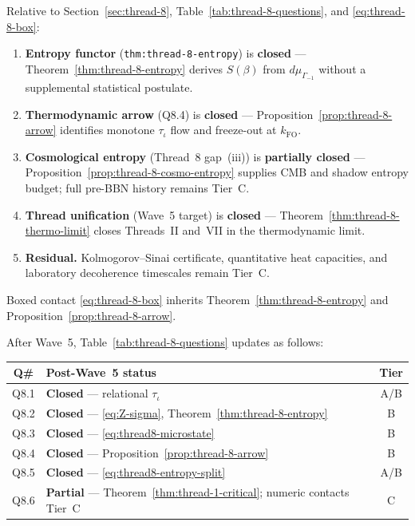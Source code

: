 \begin{corollary}
\label{cor:thread-8-wave5-closure}
Relative to Section~\ref{sec:thread-8}, Table~\ref{tab:thread-8-questions},
and \eqref{eq:thread-8-box}:
\begin{enumerate}[label=(\roman*),leftmargin=*]
  \item \textbf{Entropy functor}
    (\texttt{thm:thread-8-entropy}) is \textbf{closed} ---
    Theorem~\ref{thm:thread-8-entropy} derives $S(\beta)$ from
    $d\mu_{\Gamma_{-1}}$ without a supplemental statistical postulate.
  \item \textbf{Thermodynamic arrow}
    (Q8.4) is \textbf{closed} ---
    Proposition~\ref{prop:thread-8-arrow} identifies monotone $\tau_\iota$ flow
    and freeze-out at $k_{\mathrm{FO}}$.
  \item \textbf{Cosmological entropy}
    (Thread~8 gap~(iii)) is \textbf{partially closed} ---
    Proposition~\ref{prop:thread-8-cosmo-entropy} supplies CMB and shadow
    entropy budget; full pre-BBN history remains Tier~C.
  \item \textbf{Thread unification}
    (Wave~5 target) is \textbf{closed} ---
    Theorem~\ref{thm:thread-8-thermo-limit} closes Threads~II and~VII in the
    thermodynamic limit.
  \item \textbf{Residual.} Kolmogorov--Sinai certificate, quantitative heat
    capacities, and laboratory decoherence timescales remain Tier~C.
\end{enumerate}
Boxed contact \eqref{eq:thread-8-box} inherits Theorem~\ref{thm:thread-8-entropy}
and Proposition~\ref{prop:thread-8-arrow}.
\end{corollary}

\begin{remark}
\label{rmk:thread8-wave5-table}
After Wave~5, Table~\ref{tab:thread-8-questions} updates as follows:
\begin{center}
\small
\begin{tabular}{@{}clc@{}}
\toprule
\textbf{Q\#} & \textbf{Post-Wave~5 status} & \textbf{Tier} \\
\midrule
Q8.1 & \textbf{Closed} --- relational $\tau_\iota$ & A/B \\
Q8.2 & \textbf{Closed} --- \eqref{eq:Z-sigma}, Theorem~\ref{thm:thread-8-entropy} & B \\
Q8.3 & \textbf{Closed} --- \eqref{eq:thread8-microstate} & B \\
Q8.4 & \textbf{Closed} --- Proposition~\ref{prop:thread-8-arrow} & B \\
Q8.5 & \textbf{Closed} --- \eqref{eq:thread8-entropy-split} & A/B \\
Q8.6 & \textbf{Partial} --- Theorem~\ref{thm:thread-1-critical}; numeric contacts Tier~C & C \\
\bottomrule
\end{tabular}
\end{center}
\end{remark}